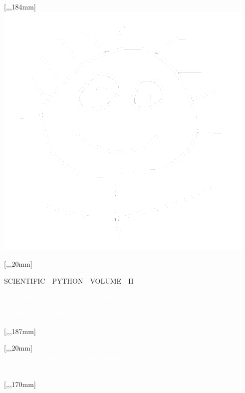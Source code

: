 \documentclass[
  coverheight=248mm, %
  coverwidth=167mm,   %
  bleedwidth=3mm,     %
  spinewidth=23mm,    %
  marklength=0mm,     %
  markcolor=white
]{bookcover}
\begin{document}
\begin{bookcover}
    
    
    [,,,184mm]{
      \centering
      \includegraphics[width=0.8\linewidth]{./gravatar.png}
    }
    
    [,,,20mm]{
      \centering
      \textcolor{yellow!80!white}{\small SCIENTIFIC~~PYTHON~~VOLUME~~II}

      \textcolor{white}{\Large \bfseries SCIENTIFIC VISUALIZATION}

      \vspace{-1pt}
      \textcolor{white}{\large PYTHON \& MATPLOTLIB}
    }

    [,,,187mm]{
      \centering
      \textcolor{white}{NICOLAS~~P.~~ROUGIER}
    }

    [,,,20mm]{
      \centering
      \textcolor{white}{In memory of\\
      \textbf{John D. Hunter}
      \&
      \textbf{Maxim Shemanarev}\\
      Two brilliant minds that are dearly missed.}
    }

    [,,,170mm]{
      \centering {}\\
    }

  \end{bookcover}
\end{document}
